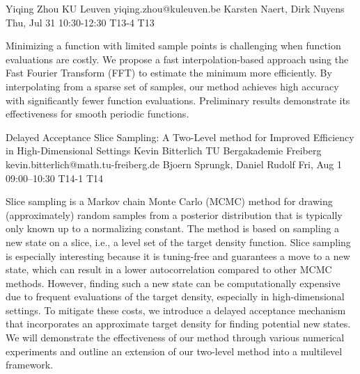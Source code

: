 \begin{talk}
  {Yiqing Zhou}%
  {KU Leuven}%
  {yiqing.zhou@kuleuven.be}%
  {Karsten Naert, Dirk Nuyens}%
  {}%
  {}%
  {Thu, Jul 31 10:30-12:30}%
  {T13-4}%
  {T13}%
  
				
			
Minimizing a function with limited sample points is challenging when function evaluations are costly. We propose a fast interpolation-based approach using the Fast Fourier Transform (FFT) to estimate the minimum more efficiently. By interpolating from a sparse set of samples, our method achieves high accuracy with significantly fewer function evaluations. Preliminary results demonstrate its effectiveness for smooth periodic functions.
\end{talk}

\begin{talk}
  {Delayed Acceptance Slice Sampling: A Two-Level method for Improved Efficiency in High-Dimensional Settings}%
  {Kevin Bitterlich}%
  {TU Bergakademie Freiberg}%
  {kevin.bitterlich@math.tu-freiberg.de}%
  {Bjoern Sprungk, Daniel Rudolf}%
  {}%
  {Fri, Aug 1 09:00–10:30}%
  {T14-1}%
  {T14}%
  
				
			
Slice sampling is a Markov chain Monte Carlo (MCMC) method for drawing (approximately) random samples from a posterior distribution that 
is typically only known up to a normalizing constant. 
The method is based on sampling a new state on a slice, i.e., a level set of the target density function. 
Slice sampling is especially interesting because it is tuning-free and guarantees a move to a new state, which can 
result in a lower autocorrelation compared to other MCMC methods. 
However, finding such a new state can be computationally expensive due to frequent evaluations of the target density, 
especially in high-dimensional settings. 
To mitigate these costs, we introduce a delayed acceptance mechanism that incorporates an approximate target density for finding potential 
new states. We will demonstrate the effectiveness of our method through various numerical experiments and outline an extension of our two-level method into a multilevel framework.


\end{talk}

